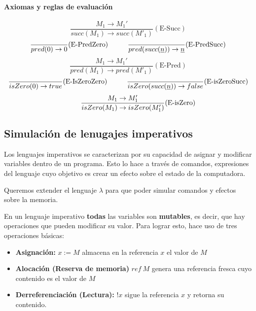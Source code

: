 \paragraph{Axiomas y reglas de evaluación}

\begin{equation*}
\frac{M_1\to M_1'}{succ(M_1)\to succ(M'_1)}(\text{E-Succ})
\end{equation*}
\vspace*{5mm}
\begin{equation*}
\frac{}{pred(0)\to 0}(\text{E-PredZero})\hspace*{1cm}\frac{}{pred(succ(\underline{n}))\to \underline{n}}(\text{E-PredSucc})
\end{equation*}
\vspace*{5mm}
\begin{equation*}
\frac{M_1\to M_1'}{pred(M_1)\to pred(M'_1)}(\text{E-Pred})
\end{equation*}
\vspace*{5mm}
\begin{equation*}
\frac{}{isZero(0)\to true}(\text{E-IsZeroZero})\hspace*{1cm}\frac{}{isZero(succ(\underline{n}))\to false}(\text{E-isZeroSucc})
\end{equation*}
\vspace*{5mm}
\begin{equation*}
\hspace*{1cm}\frac{M_1\to M'_1}{isZero(M_1)\to isZero(M_1')}(\text{E-isZero})
\end{equation*}



\subsection{Simulación de lenugajes imperativos}
Los lenguajes imperativos se caracterizan por su capacidad de asignar y modificar variables dentro de un programa. Esto lo hace a través de comandos, expresiones del lenguaje cuyo objetivo es crear un efecto sobre el estado de la computadora. 

Queremos extender el lenguaje $\lambda$ para que poder simular comandos y efectos sobre la memoria.

En un lenguaje imperativo \textbf{todas} las variables son \textbf{mutables}, es decir, que hay operaciones que pueden modificar su valor. Para lograr esto, hace uso de tres operaciones básicas:

\begin{itemize}
    \item \textbf{Asignación:} $x := M$ almacena en la referencia $x$ el valor de $M$
    \item \textbf{Alocación (Reserva de memoria)} $ref~M$ genera una referencia fresca cuyo contenido es el valor de $M$
    \item \textbf{Derreferenciación (Lectura):} $!x$ sigue la referencia $x$ y retorna su contenido.
\end{itemize}


